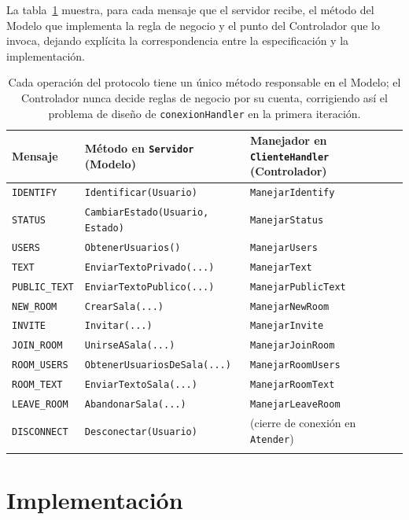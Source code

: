 \documentclass[11pt,letterpaper]{article}
\begin{document}
La tabla~\ref{tab:trazabilidad} muestra, para cada mensaje que el servidor
recibe, el método del Modelo que implementa la regla de negocio y el punto
del Controlador que lo invoca, dejando explícita la correspondencia entre
la especificación y la implementación.

\begin{longtable}{@{}p{2.3cm}p{5.2cm}p{5.5cm}@{}}
\toprule
\textbf{Mensaje} & \textbf{Método en \texttt{Servidor} (Modelo)} & \textbf{Manejador en \texttt{ClienteHandler} (Controlador)} \\
\midrule
\endhead
\texttt{IDENTIFY} & \texttt{Identificar(Usuario)} & \texttt{ManejarIdentify} \\
\texttt{STATUS} & \texttt{CambiarEstado(Usuario, Estado)} & \texttt{ManejarStatus} \\
\texttt{USERS} & \texttt{ObtenerUsuarios()} & \texttt{ManejarUsers} \\
\texttt{TEXT} & \texttt{EnviarTextoPrivado(...)} & \texttt{ManejarText} \\
\texttt{PUBLIC\_TEXT} & \texttt{EnviarTextoPublico(...)} & \texttt{ManejarPublicText} \\
\texttt{NEW\_ROOM} & \texttt{CrearSala(...)} & \texttt{ManejarNewRoom} \\
\texttt{INVITE} & \texttt{Invitar(...)} & \texttt{ManejarInvite} \\
\texttt{JOIN\_ROOM} & \texttt{UnirseASala(...)} & \texttt{ManejarJoinRoom} \\
\texttt{ROOM\_USERS} & \texttt{ObtenerUsuariosDeSala(...)} & \texttt{ManejarRoomUsers} \\
\texttt{ROOM\_TEXT} & \texttt{EnviarTextoSala(...)} & \texttt{ManejarRoomText} \\
\texttt{LEAVE\_ROOM} & \texttt{AbandonarSala(...)} & \texttt{ManejarLeaveRoom} \\
\texttt{DISCONNECT} & \texttt{Desconectar(Usuario)} & (cierre de conexión en \texttt{Atender}) \\
\bottomrule
\caption{Cada operación del protocolo tiene un único método responsable en
el Modelo; el Controlador nunca decide reglas de negocio por su cuenta,
corrigiendo así el problema de diseño de \texttt{conexionHandler} en la
primera iteración.}
\label{tab:trazabilidad}
\end{longtable}

\section{Implementación}
\end{document}
